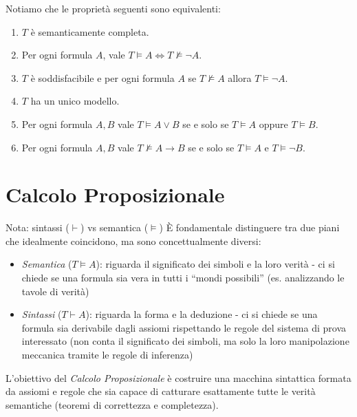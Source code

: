 \documentclass[a4paper,11pt]{report}
\begin{document}
\vspace{1em}

\begin{gframe}{}{}
    Notiamo che le proprietà seguenti sono equivalenti:
    \vspace{-1em}
    \begin{enumerate}
        \item \(T\) è semanticamente completa.
        \item Per ogni formula \(A\), vale \(T \models A \iff T \not\models \neg A\).
        \item \(T\) è soddisfacibile e per ogni formula \(A\) se \(T \not\models A\) allora \(T \models \neg A\).
        \item \(T\) ha un unico modello.
        \item Per ogni formula \(A, B\) vale \(T \models A \lor B\) se e solo se \(T \models A\) oppure \(T \models B\).
        \item Per ogni formula \(A, B\) vale \(T \not\models A \to B\) se e solo se \(T \models A\) e \(T \models \neg B\).
    \end{enumerate}
\end{gframe}

\pagebreak

\chapter{Calcolo Proposizionale}

\begin{gframe}{Nota: sintassi (\( \vdash \)) vs semantica (\( \vDash \))}
    È fondamentale distinguere tra due piani che idealmente coincidono, ma sono concettualmente diversi:
    \begin{itemize}
    \item \textit{Semantica} (\( T \vDash A \)): riguarda il significato dei simboli e la loro verità - ci si chiede se una formula sia vera in tutti i ``mondi possibili'' (es. analizzando le tavole di verità)
\item \textit{Sintassi} (\( T \vdash A \)): riguarda la forma e la deduzione - ci si chiede se una formula sia derivabile dagli assiomi rispettando le regole del sistema di prova interessato (non conta il significato dei simboli, ma solo la loro manipolazione meccanica tramite le regole di inferenza)
    \end{itemize}

    L'obiettivo del \textit{Calcolo Proposizionale} è costruire una macchina sintattica formata da assiomi e regole che sia capace di catturare esattamente tutte le verità semantiche (teoremi di correttezza e completezza).
\end{gframe}
\end{document}
